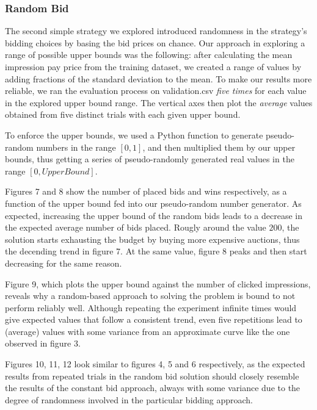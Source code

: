 \documentclass{sig-alternate-05-2015}
\begin{document}
\subsubsection{Random Bid}

The second simple strategy we explored introduced randomness in the strategy's bidding choices by basing the bid prices on chance. Our approach in exploring a range of possible upper bounds was the following: after calculating the mean impression pay price from the training dataset, we created a range of values by adding fractions of the standard deviation to the mean. To make our results more reliable, we ran the evaluation process on validation.csv \textit{five times} for each value in the explored upper bound range. The vertical axes then plot the \textit{average} values obtained from five distinct trials with each given upper bound.

To enforce the upper bounds, we used a Python function to generate pseudo-random numbers in the range $[0,1]$, and then multiplied them by our upper bounds, thus getting a series of pseudo-randomly generated real values in the range $[0, UpperBound]$.

Figures 7 and 8 show the number of placed bids and wins respectively, as a function of the upper bound fed into our pseudo-random number generator. As expected, increasing the upper bound of the random bids leads to a decrease in the expected average number of bids placed. Rougly around the value $200$, the solution starts exhausting the budget by buying more expensive auctions, thus the decending trend in figure 7. At the same value, figure 8 peaks and then start decreasing for the same reason.

Figure 9, which plots the upper bound against the number of clicked impressions, reveals why a random-based approach to solving the problem is bound to not perform reliably well. Although repeating the experiment infinite times would give expected values that follow a consistent trend, even five repetitions lead to (average) values with some variance from an approximate curve like the one observed in figure 3.

Figures 10, 11, 12 look similar to figures 4, 5 and 6 respectively, as the expected results from repeated trials in the random bid solution should closely resemble the results of the constant bid approach, always with some variance due to the degree of randomness involved in the particular bidding approach.
\end{document}
